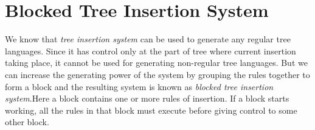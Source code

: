 

\section{Blocked Tree Insertion System}
We know that \emph{tree insertion system} can be used to generate any regular tree languages. Since it has control only at the part
of tree where current insertion taking place, it cannot be used for generating non-regular tree languages. But we can increase the 
generating power of the system by grouping the rules together to form a block and the resulting system is known as \emph{blocked 
tree insertion system}.Here a block contains one or more rules of insertion. If a block starts working, all the rules in that block must 
execute before giving control to some other block. 

